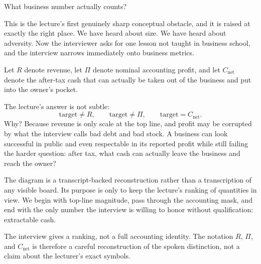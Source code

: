 What business number actually counts?

This is the lecture's first genuinely sharp conceptual obstacle, and it is raised at exactly the right place. We have heard about size. We have heard about adversity. Now the interviewer asks for one lesson not taught in business school, and the interview narrows immediately onto business metrics.

\begin{definition}
Let \(R\) denote revenue, let \(\Pi\) denote nominal accounting profit, and let \(C_{\text{net}}\) denote the after-tax cash that can actually be taken out of the business and put into the owner's pocket.
\end{definition}

The lecture's answer is not subtle:
\begin{equation}
\text{target} \neq R, \qquad \text{target} \neq \Pi, \qquad \text{target} = C_{\text{net}}.
\end{equation}
Why? Because revenue is only scale at the top line, and profit may be corrupted by what the interview calls bad debt and bad stock. A business can look successful in public and even respectable in its reported profit while still failing the harder question: after tax, what cash can actually leave the business and reach the owner?

\begin{figure}
\centering
{}
\end{figure}

The diagram is a transcript-backed reconstruction rather than a transcription of any visible board. Its purpose is only to keep the lecture's ranking of quantities in view. We begin with top-line magnitude, pass through the accounting mask, and end with the only number the interview is willing to honor without qualification: extractable cash.

\begin{remark}
The interview gives a ranking, not a full accounting identity. The notation \(R\), \(\Pi\), and \(C_{\text{net}}\) is therefore a careful reconstruction of the spoken distinction, not a claim about the lecturer's exact symbols.
\end{remark}

